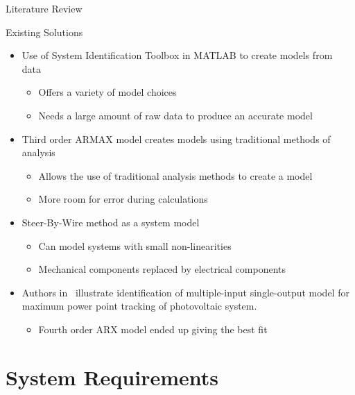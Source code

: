 \documentclass{beamer}
\begin{document}
\begin{frame}{Literature Review}
  \begin{block}{Existing Solutions}
 \begin{itemize}
        \item Use of System Identification Toolbox in MATLAB to create models from data~\cite{Adnan2010}
	 \begin{itemize}
     \tiny
		    		\item Offers a variety of model choices
				\item Needs a large amount of raw data to produce an accurate model
	\end{itemize}
	\item Third order ARMAX model creates models using traditional methods of analysis~\cite{Li1999}
	 \begin{itemize}
     \tiny
		    		\item Allows the use of traditional analysis methods to create a model 
				\item More room for error during calculations
	\end{itemize}
	\item Steer-By-Wire method as a system model~\cite{Saruchi2015}
	 \begin{itemize}
     \tiny
		    		\item Can model systems with small non-linearities 
				\item Mechanical components replaced by electrical components 
	\end{itemize}
	\item Authors in~\cite{Hussain2011} illustrate identification of multiple-input single-output model for maximum power point tracking of photovoltaic system.  
	\begin{itemize}
    \tiny
		\item Fourth order ARX model ended up giving the best fit
	\end{itemize}
\end{itemize}
  \end{block}
\end{frame}



\section{System Requirements}
\end{document}
